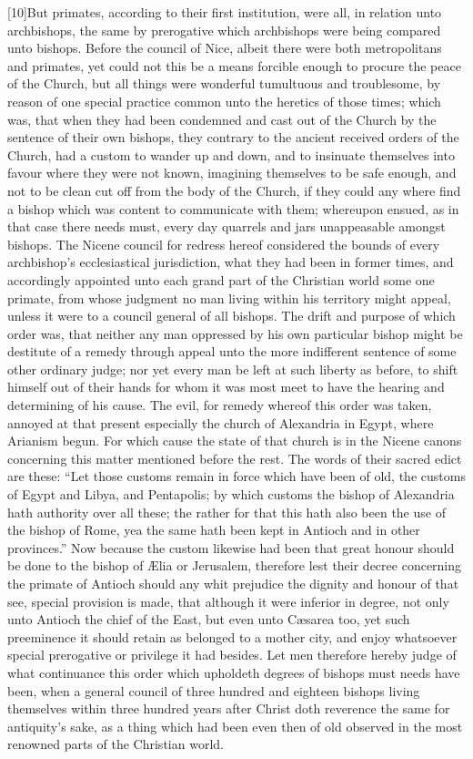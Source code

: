 [10]But primates, according to their first institution, were all, in relation unto archbishops, the same by prerogative which archbishops were being compared unto bishops. Before  the council of Nice, albeit there were both metropolitans and primates, yet could not this be a means forcible enough to procure the peace of the Church, but all things were wonderful tumultuous and troublesome, by reason of one special practice common unto the heretics of those times; which was, that when they had been condemned and cast out of the Church by the sentence of their own bishops, they contrary to the ancient received orders of the Church, had a custom to wander up and down, and to insinuate themselves into favour where they were not known, imagining themselves to be safe enough, and not to be clean cut off from the body of the Church, if they could any where find a bishop which was content to communicate with them; whereupon ensued, as in that case there needs must, every day quarrels and jars unappeasable amongst bishops. The Nicene council for redress hereof considered the bounds of every archbishop’s ecclesiastical jurisdiction, what they had been in former times, and accordingly appointed unto each grand part of the Christian world some one primate, from whose judgment no man living within his territory might appeal, unless it were to a council general of all bishops. The drift and purpose of which order was, that neither any man oppressed by his own particular bishop might be destitute of a remedy through appeal unto the more indifferent sentence of some other ordinary judge; nor yet every man be left at such liberty as before, to shift himself out of their hands for whom it was most meet to have the hearing and determining of his cause. The evil, for remedy whereof this order was taken, annoyed at that present especially the church of Alexandria in Egypt, where Arianism begun. For which cause the state of that church is in the Nicene canons concerning this matter mentioned before the rest. The words of their sacred edict are these: “Let those customs remain in force which have been of old, the  customs of Egypt and Libya,
 and Pentapolis; by which customs the bishop of Alexandria hath authority over all these; the rather for that this hath also been the use of the bishop of Rome, yea the same hath been kept in Antioch and in other provinces.” Now because the custom likewise had been that great honour should be done to the bishop of Ælia or Jerusalem, therefore lest their decree concerning the primate of Antioch should any whit prejudice the dignity and honour of that see, special provision is made, that although it were inferior in degree, not only unto Antioch the chief of the East, but even unto Cæsarea too, yet such preeminence it should retain as belonged to a mother city, and enjoy whatsoever special prerogative or privilege it had besides. Let men therefore hereby judge of what continuance this order which upholdeth degrees of bishops must needs have been, when a general council of three hundred and eighteen bishops living themselves within three hundred years after Christ doth reverence the same for antiquity’s sake, as a thing which had been even then of old observed in the most renowned parts of the Christian world.

